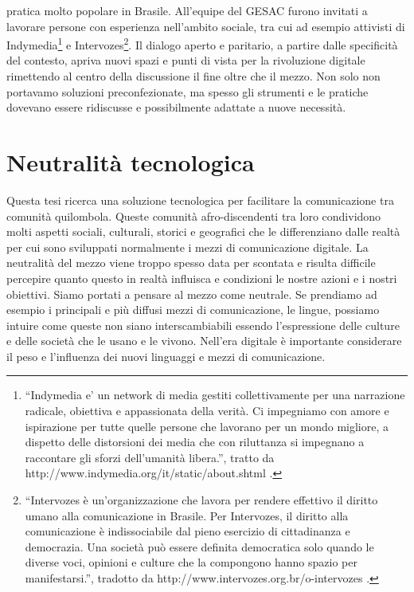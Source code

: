 pratica molto popolare in Brasile. All'equipe del GESAC furono
invitati a lavorare persone con esperienza nell'ambito sociale, tra
cui ad esempio attivisti di Indymedia\footnote{``Indymedia e' un
  network di media gestiti collettivamente per una narrazione
  radicale, obiettiva e appassionata della verità. Ci impegniamo con
  amore e ispirazione per tutte quelle persone che lavorano per un
  mondo migliore, a dispetto delle distorsioni dei media che con
  riluttanza si impegnano a raccontare gli sforzi dell'umanità
  libera.'', tratto da http://www.indymedia.org/it/static/about.shtml
  .} e Intervozes\footnote{``Intervozes è un'organizzazione che
  lavora per rendere effettivo il diritto umano alla comunicazione in
  Brasile.  Per Intervozes, il diritto alla comunicazione è
  indissociabile dal pieno esercizio di cittadinanza e democrazia. Una
  società può essere definita democratica solo quando le diverse voci,
  opinioni e culture che la compongono hanno spazio per
  manifestarsi.'', tradotto da
  http://www.intervozes.org.br/o-intervozes .}. Il dialogo aperto e
paritario, a partire dalle specificità del contesto, apriva nuovi
spazi e punti di vista per la rivoluzione digitale rimettendo al
centro della discussione il fine oltre che il mezzo. Non solo non
portavamo soluzioni preconfezionate, ma spesso gli strumenti e le
pratiche dovevano essere ridiscusse e possibilmente adattate a nuove
necessità.

\section{Neutralità tecnologica}
Questa tesi ricerca una soluzione tecnologica per facilitare la
comunicazione tra comunità quilombola. Queste comunità
afro-discendenti tra loro condividono molti aspetti sociali,
culturali, storici e geografici che le differenziano dalle realtà per
cui sono sviluppati normalmente i mezzi di comunicazione digitale.  La
neutralità del mezzo viene troppo spesso data per scontata e risulta
difficile percepire quanto questo in realtà influisca e condizioni le
nostre azioni e i nostri obiettivi. Siamo portati a pensare al mezzo
come neutrale. Se prendiamo ad esempio i principali e più diffusi
mezzi di comunicazione, le lingue, possiamo intuire come queste non
siano interscambiabili essendo l'espressione delle culture e delle
società che le usano e le vivono. Nell'era digitale è importante
considerare il peso e l'influenza dei nuovi linguaggi e mezzi di
comunicazione.

